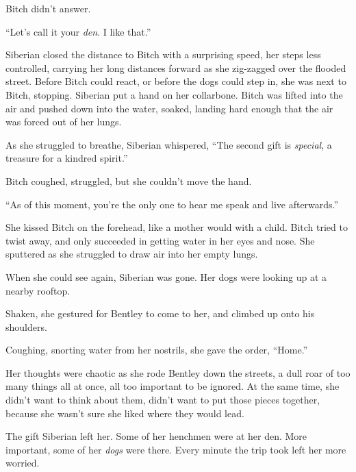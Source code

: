 Bitch didn't answer.



``Let's call it your \emph{den}.  I like that.''



Siberian closed the distance to Bitch with a surprising speed, her steps less controlled, carrying her long distances forward as she zig-zagged over the flooded street.  Before Bitch could react, or before the dogs could step in, she was next to Bitch, stopping.  Siberian put a hand on her collarbone.  Bitch was lifted into the air and pushed down into the water, soaked, landing hard enough that the air was forced out of her lungs.



As she struggled to breathe, Siberian whispered, ``The second gift is \emph{special}, a treasure for a kindred spirit.''



Bitch coughed, struggled, but she couldn't move the hand.



``As of this moment, you're the only one to hear me speak and live afterwards.''



She kissed Bitch on the forehead, like a mother would with a child.  Bitch tried to twist away, and only succeeded in getting water in her eyes and nose.  She sputtered as she struggled to draw air into her empty lungs.



When she could see again, Siberian was gone.  Her dogs were looking up at a nearby rooftop.



Shaken, she gestured for Bentley to come to her, and climbed up onto his shoulders.



Coughing, snorting water from her nostrils, she gave the order, ``Home.''



Her thoughts were chaotic as she rode Bentley down the streets, a dull roar of too many things all at once, all too important to be ignored.  At the same time, she didn't want to think about them, didn't want to put those pieces together, because she wasn't sure she liked where they would lead.



The gift Siberian left her.  Some of her henchmen were at her den.  More important, some of her \emph{dogs} were there.  Every minute the trip took left her more worried.



